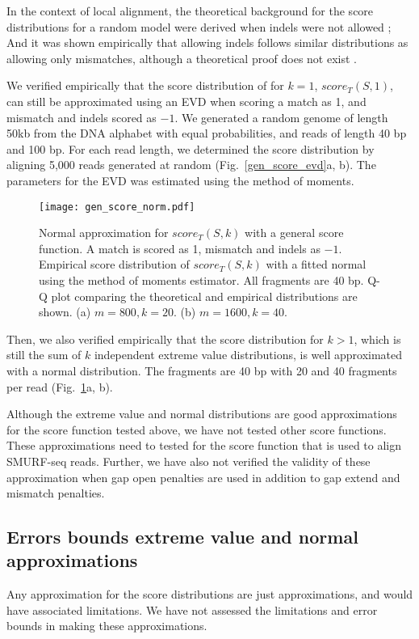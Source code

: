 In the context of local alignment, the theoretical background for the
score distributions for a random model were derived when indels were not
allowed \citep{karlin1990methods,karlin1990statistical};
And it was shown empirically that allowing indels
follows similar distributions as allowing only mismatches, although a
theoretical proof does not exist
\citep{pearson1998empirical,smith1985statistical,altschul199627}.

We verified empirically that the score distribution of for $k=1$,
$score_T(S,1)$, can still be approximated using an EVD when scoring a
match as 1, and mismatch and indels scored as $-1$. We generated a random
genome of length 50kb from the DNA alphabet with equal probabilities,
and reads of length 40 bp and 100 bp. For each read length, we
determined the score distribution by aligning 5,000 reads generated at
random (Fig.~\ref{gen_score_evd}a, b). The parameters for the EVD was
estimated using the method of moments.

\begin{figure}[t!]
\centering
\texttt{[image: gen\_score\_norm.pdf]}
\caption[Normal approximation for $score_T(S,k)$ with a general score
  function]{
  Normal approximation for $score_T(S,k)$ with a general score function.
  A match is scored as 1, mismatch and indels as $-1$.
  Empirical score distribution of $score_T(S,k)$ with a fitted
  normal using the method of moments estimator. All fragments are 40 bp.
  Q-Q plot comparing the theoretical and empirical distributions are shown.
  (a) $m=800, k=20$.
  (b) $m=1600, k=40$.}
\label{gen_score_norm}
\end{figure}

Then, we also verified empirically that the score distribution for $k >
1$, which is still the sum of $k$ independent extreme value
distributions, is well approximated with a normal distribution. The
fragments are 40 bp with 20 and 40 fragments per read
(Fig.~\ref{gen_score_norm}a, b).


Although the extreme value and normal distributions are good
approximations for the score function tested above, we have not tested
other score functions. These approximations need to tested for the score
function that is used to align SMURF-seq reads. Further, we have also
not verified the validity of these approximation when gap open penalties
are used in addition to gap extend and mismatch penalties.

\subsection*{Errors bounds extreme value and normal approximations}
Any approximation for the score distributions are just approximations,
and would have associated limitations. We have not assessed the
limitations and error bounds in making these approximations.

